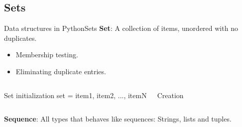 \documentclass[10pt,compress]{beamer} %
\begin{document}
\subsection{Sets}
\begin{frame}{Data structures in Python}{Sets}
\vspace{-0.2cm}
	\textbf{Set}: A collection of items, unordered with no duplicates.
		\begin{itemize}
		\item \small{Membership testing.}
		\item \small{Eliminating duplicate entries.}
		\end{itemize}
\vspace{-0.2cm}
    \begin{columns}

		\begin{block}{Set initialization}
        set = {item1, item2, ..., itemN}
		\end{block}

		
%		

 	  \scriptsize{
 	   \begin{exampleblock}{Creation}
		\vspace{-0.2cm}
		
		
		\vspace{-0.2cm}
		
		\end{exampleblock}
		\vspace{0.3cm}
		}
	\end{columns}
	\vspace{0.1cm}
\small{\textbf{Sequence}: All types that behaves like sequences: Strings, lists and tuples.}
\end{frame}

	

%		
\end{document}
